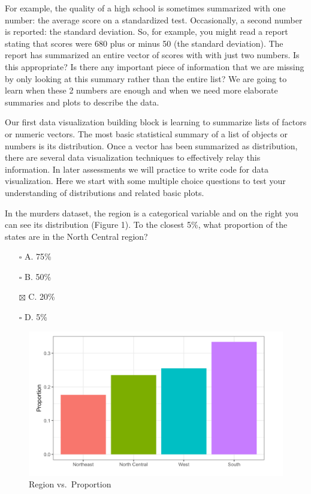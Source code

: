 \documentclass[
]{article}
\providecommand{\tightlist}{%
  \setlength{\itemsep}{0pt}\setlength{\parskip}{0pt}}
\begin{document}
For example, the quality of a high school is sometimes summarized with
one number: the average score on a standardized test. Occasionally, a
second number is reported: the standard deviation. So, for example, you
might read a report stating that scores were 680 plus or minus 50 (the
standard deviation). The report has summarized an entire vector of
scores with with just two numbers. Is this appropriate? Is there any
important piece of information that we are missing by only looking at
this summary rather than the entire list? We are going to learn when
these 2 numbers are enough and when we need more elaborate summaries and
plots to describe the data.

Our first data visualization building block is learning to summarize
lists of factors or numeric vectors. The most basic statistical summary
of a list of objects or numbers is its distribution. Once a vector has
been summarized as distribution, there are several data visualization
techniques to effectively relay this information. In later assessments
we will practice to write code for data visualization. Here we start
with some multiple choice questions to test your understanding of
distributions and related basic plots.

In the murders dataset, the region is a categorical variable and on the
right you can see its distribution (Figure 1). To the closest 5\%, what
proportion of the states are in the North Central region?

\begin{itemize}
\tightlist
\item[$\square$]
  A. 75\%
\item[$\square$]
  B. 50\%
\item[$\boxtimes$]
  C. 20\%
\item[$\square$]
  D. 5\%
\end{itemize}

\begin{figure}
\centering
\includegraphics{images/Region vs Proportion.png}
\caption{Region vs.~Proportion}
\end{figure}
\end{document}
